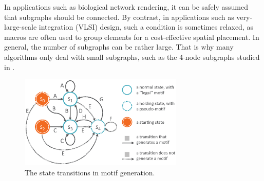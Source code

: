 \vspace{-1mm}
In applications such as biological network rendering, it can be safely assumed that subgraphs should be connected.
By contrast, in applications such as very-large-scale integration (VLSI) design, such a condition is sometimes relaxed, as macros are often used to group elements for a cost-effective spatial placement.
In general, the number of subgraphs can be rather large.
That is why many algorithms only deal with small subgraphs, such as the 4-node subgraphs studied in \cite{Milo:2002}.

\begin{figure}[t]
\centering
\includegraphics[width=78mm]{images/automacron/Transition.eps}
\caption{The state transitions in motif generation.}
\vspace{-3mm}
\label{fig:Transitions}
\end{figure}

